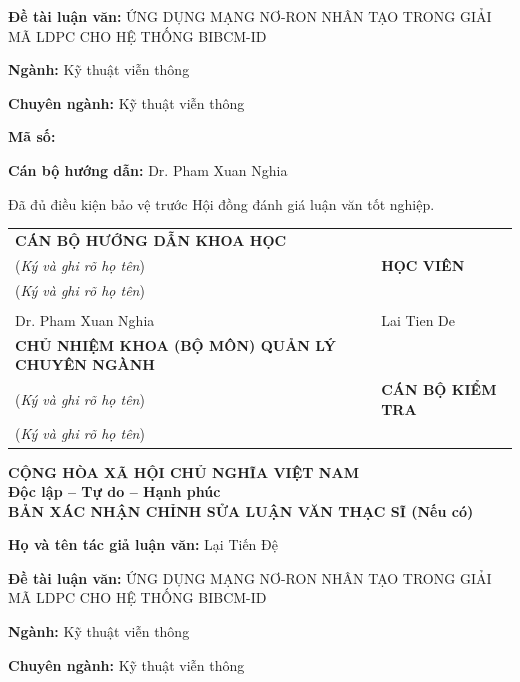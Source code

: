 \documentclass[a4paper,14pt]{extreport}
\newcommand{\titleVN}{ỨNG DỤNG MẠNG NƠ-RON NHÂN TẠO TRONG GIẢI MÃ LDPC CHO HỆ THỐNG BIBCM-ID}
\newcommand{\authorVN}{Lai Tien De}
\newcommand{\supervisorVN}{Dr. Pham Xuan Nghia}
\begin{document}
\noindent\textbf{Đề tài luận văn:} \titleVN

\noindent\textbf{Ngành:} Kỹ thuật viễn thông

\noindent\textbf{Chuyên ngành:} Kỹ thuật viễn thông

\noindent\textbf{Mã số:} \dotfill

\noindent\textbf{Cán bộ hướng dẫn:} \supervisorVN

\vspace{0.5cm}
\noindent\hspace{1cm}Đã đủ điều kiện bảo vệ trước Hội đồng đánh giá luận văn tốt nghiệp.

\vspace{2cm}
\begin{table}[H]
    \centering
    \begin{tabular}{p{7cm}p{7cm}}
        \centering\textbf{CÁN BỘ HƯỚNG DẪN KHOA HỌC}\\(\textit{Ký và ghi rõ họ tên}) & \centering\textbf{HỌC VIÊN}\\(\textit{Ký và ghi rõ họ tên}) \tabularnewline
        & \\[2cm]
        \centering \supervisorVN & \centering \authorVN \tabularnewline
        
        \centering\textbf{CHỦ NHIỆM KHOA (BỘ MÔN) QUẢN LÝ CHUYÊN NGÀNH}\\(\textit{Ký và ghi rõ họ tên}) & \centering\textbf{CÁN BỘ KIỂM TRA}\\(\textit{Ký và ghi rõ họ tên}) \tabularnewline
    \end{tabular}
\end{table}


\newpage
\begin{center}
    \textbf{CỘNG HÒA XÃ HỘI CHỦ NGHĨA VIỆT NAM}\\
    \textbf{Độc lập -- Tự do -- Hạnh phúc}\\[1cm]
    \textbf{BẢN XÁC NHẬN CHỈNH SỬA LUẬN VĂN THẠC SĨ (Nếu có)}
\end{center}

\vspace{1cm}
\noindent\textbf{Họ và tên tác giả luận văn:} Lại Tiến Đệ

\noindent\textbf{Đề tài luận văn:} \titleVN

\noindent\textbf{Ngành:} Kỹ thuật viễn thông

\noindent\textbf{Chuyên ngành:} Kỹ thuật viễn thông
\end{document}
